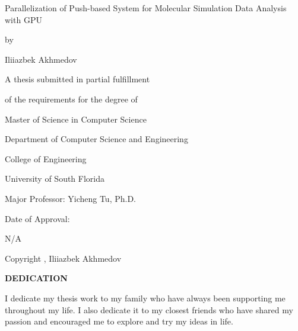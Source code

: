 \documentclass[11pt,a4paper]{report}
\begin{document}
%
%
\thispagestyle{empty}

{%
\sffamily
\centering

{\Large 
Parallelization of Push-based System for Molecular Simulation Data Analysis with GPU
}

\vspace{1.5cm}

{
by
}
\vspace{.5cm}

{ 
Iliiazbek Akhmedov
}

\vspace{3.5cm}

A thesis submitted in partial fulfillment

of the requirements for the degree of

Master of Science in Computer Science

Department of Computer Science and Engineering

College of Engineering

University of South Florida

\vspace{3.5cm}
Major Professor:  Yicheng Tu, Ph.D.
\vspace{\fill}


\vspace{.5cm}
Date of Approval:

N/A
\vspace{\fill}

Copyright \textcopyright{}, Iliiazbek Akhmedov

}%

\clearpage


\pagestyle{plain}
\centering

\textbf{DEDICATION}
\vspace{0.5cm}

\begin{flushleft}
\hspace{3em} I dedicate my thesis work to my family who have always been supporting me throughout my life. I also dedicate it to my closest friends who have shared my passion and encouraged me to explore and try my ideas in life.
\end{flushleft}
\end{document}
